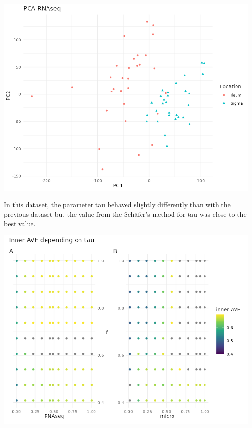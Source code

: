 \documentclass[
  12pt,
  a4paper,
  twoside,
  openright]{book}
\let\origfigure\figure
\let\endorigfigure\endfigure
\renewenvironment{figure}[1][2] {
    \expandafter\origfigure\expandafter[!htbp]
} {
    \endorigfigure
}
\begin{document}
\begin{figure}
\includegraphics[width=1\linewidth]{images/hasler_PCA_RNAseq} \caption[PCA of RNAseq of the Häsler's dataset.]{PCA of RNAseq of the Häsler's dataset. There are two clear groups according to the location on the first component. Each point represents a sample (colored and shaped by location).}\label{fig:hasler-pca-RNAseq}
\end{figure}

In this dataset, the parameter tau behaved slightly differently than with the previous dataset but the value from the Schäfer's method for tau was close to the best value.

\begin{figure}
\includegraphics[width=1\linewidth]{images/hasler-centroid_tau} \caption[Tau effect on inner AVE in the Häsler's dataset.]{Changes on tau on the centroid scheme in the Häsler dataset affect the inner AVE score on the model 1. The panel A shows on the ordinate the RNAseq tau value, the panel B on the right, shows the tau of the microorganism; both of them show the y's tau on the abscissa.}\label{fig:hasler-tau}
\end{figure}
\end{document}
